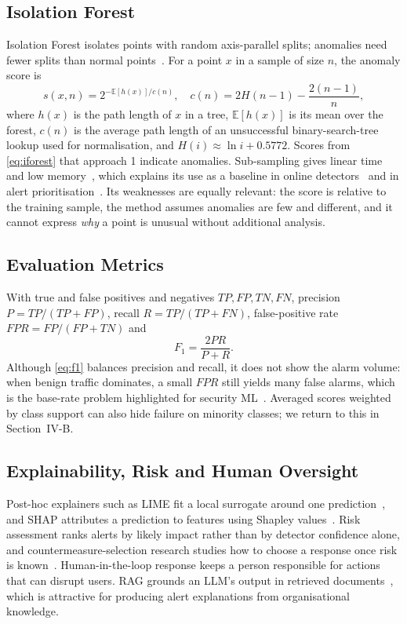 \documentclass[conference]{IEEEtran}
\begin{document}
\subsection{Isolation Forest}
Isolation Forest isolates points with random axis-parallel splits; anomalies need fewer splits than normal points~\cite{liu2008isolation}. For a point $x$ in a sample of size $n$, the anomaly score is
\begin{equation}
s(x,n)=2^{-\mathbb{E}[h(x)]/c(n)},\quad c(n)=2H(n-1)-\frac{2(n-1)}{n},
\label{eq:iforest}
\end{equation}
where $h(x)$ is the path length of $x$ in a tree, $\mathbb{E}[h(x)]$ is its mean over the forest, $c(n)$ is the average path length of an unsuccessful binary-search-tree lookup used for normalisation, and $H(i)\approx\ln i+0.5772$. Scores from \eqref{eq:iforest} that approach 1 indicate anomalies. Sub-sampling gives linear time and low memory~\cite{liu2008isolation}, which explains its use as a baseline in online detectors~\cite{mirsky2018kitsune} and in alert prioritisation~\cite{aminanto2020threat}. Its weaknesses are equally relevant: the score is relative to the training sample, the method assumes anomalies are few and different, and it cannot express \emph{why} a point is unusual without additional analysis.

\subsection{Evaluation Metrics}
With true and false positives and negatives $TP, FP, TN, FN$, precision $P=TP/(TP+FP)$, recall $R=TP/(TP+FN)$, false-positive rate $\mathit{FPR}=FP/(FP+TN)$ and
\begin{equation}
F_1=\frac{2PR}{P+R}.
\label{eq:f1}
\end{equation}
Although \eqref{eq:f1} balances precision and recall, it does not show the alarm volume: when benign traffic dominates, a small $\mathit{FPR}$ still yields many false alarms, which is the base-rate problem highlighted for security ML~\cite{arp2022dos}. Averaged scores weighted by class support can also hide failure on minority classes; we return to this in Section~IV-B.

\subsection{Explainability, Risk and Human Oversight}
Post-hoc explainers such as LIME fit a local surrogate around one prediction~\cite{ribeiro2016why}, and SHAP attributes a prediction to features using Shapley values~\cite{lundberg2017unified}. Risk assessment ranks alerts by likely impact rather than by detector confidence alone, and countermeasure-selection research studies how to choose a response once risk is known~\cite{nespoli2018optimal}. Human-in-the-loop response keeps a person responsible for actions that can disrupt users. RAG grounds an LLM's output in retrieved documents~\cite{lewis2020retrieval}, which is attractive for producing alert explanations from organisational knowledge.
\end{document}
